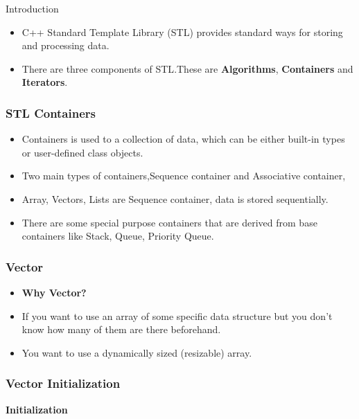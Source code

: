 \begin{frame}{Introduction}
    \begin{itemize}
        \item C++ Standard Template Library (STL) provides standard ways for storing and processing data.\pause[]
        \item There are three components of \textsf{STL}.\pause[] These are \textbf{Algorithms}, \textbf{Containers} and \textbf{Iterators}.
    \end{itemize}
\end{frame}

\begin{frame}
    \frametitle{STL Containers}

    \begin{itemize}
        \item Containers is used to a collection of data, which can be either built-in types or user-defined class objects.\pause[]
        \item Two main types of containers,\pause[] \textsf{Sequence container} and \textsf{Associative container},\pause[]
        \item Array, Vectors, Lists are Sequence container, data is stored sequentially.\pause[]
        \item There are some special purpose containers that are derived from base containers like \textsf{Stack, Queue, Priority Queue}.
    \end{itemize}

\end{frame}

\begin{frame}
    \frametitle{Vector}
    
    \begin{itemize}
        \item \textbf{Why Vector?} \pause[]
        \item If you want to use an array of some specific data structure but you don't know how many of them are there beforehand. \pause[]
        \item You want to use a dynamically sized (resizable) array.
    \end{itemize}

\end{frame}

\begin{frame}
    \frametitle{Vector Initialization}
    \textbf{Initialization}

    

\end{frame}


